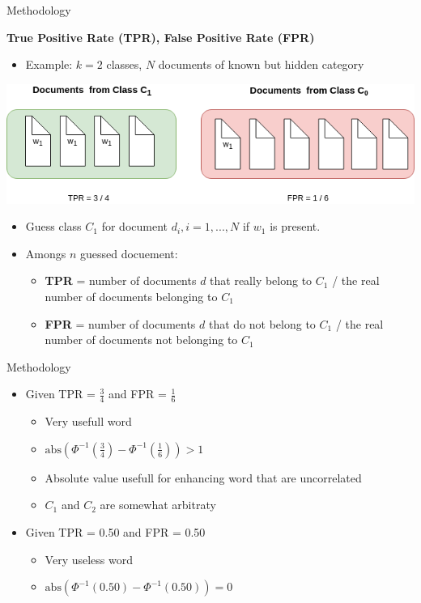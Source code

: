 \begin{frame}[label=metho]{Methodology}

	\textbf{True Positive Rate (TPR), False Positive Rate (FPR)}
	\begin{itemize}
		\item Example: $k=2$ classes, $N$ documents of known but hidden category
	\end{itemize}

			\includegraphics[width=\textwidth]{images/TPRFPR_example.png}

	\begin{itemize}
		\item Guess class $C_1$ for document $d_i, i = 1,...,N$ if $w_1$ is present.
			\item Amongs $n$ guessed docuement:
		\begin{itemize}

			\item \textbf{TPR} = number of documents $d$ that really belong to $C_1$ / the real number of documents belonging to $C_1$
			\item \textbf{FPR} = number of documents $d$ that do not belong to $C_1$ / the real number of documents not belonging to $C_1$
		\end{itemize}
	\end{itemize}

			


\end{frame}

\begin{frame}[label=metho]{Methodology}
		\begin{itemize}
		\item Given TPR = $\frac{3}{4}$ and FPR = $\frac{1}{6}$
			\begin{itemize}
				\item Very usefull word
				\item $\textrm{abs}(\Phi^{-1}(\frac{3}{4}) - \Phi^{-1}(\frac{1}{6}) ) > 1$ 
				\item Absolute value usefull for enhancing word that are uncorrelated
				\item $C_1$ and $C_2$ are somewhat arbitraty
			\end{itemize}
		\item Given TPR = 0.50 and FPR = 0.50
		\begin{itemize}
			\item Very useless word
			\item $\textrm{abs}(\Phi^{-1}(0.50) - \Phi^{-1}(0.50) ) = 0$ 
		\end{itemize}
	
	\end{itemize}
\end{frame}

